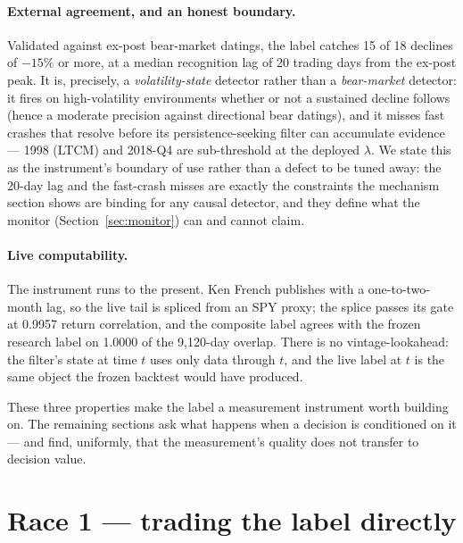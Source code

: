 \documentclass[11pt]{article}
\newcommand{\aidraft}[1]{{\color{aidraftcolor}#1}} %
\newcommand{\aidraft}[1]{#1}
\newcommand{\bearsCaught}{15 of 18}
\newcommand{\detLag}{20}              %
\newcommand{\spliceCorr}{0.9957}
\newcommand{\overlapAgree}{1.0000}
\newcommand{\overlapDays}{9{,}120}
\begin{document}
\paragraph{External agreement, and an honest boundary.}
\aidraft{%
Validated against ex-post bear-market datings, the label catches \bearsCaught{} declines of
$-15\%$ or more, at a median recognition lag of \detLag{} trading days from the ex-post peak.
It is, precisely, a \emph{volatility-state} detector rather than a \emph{bear-market} detector: it
fires on high-volatility environments whether or not a sustained decline follows (hence a moderate
precision against directional bear datings), and it misses fast crashes that resolve before its
persistence-seeking filter can accumulate evidence --- 1998 (LTCM) and 2018-Q4 are sub-threshold at
the deployed $\lambda$.
We state this as the instrument's boundary of use rather than a defect to be tuned away: the
\detLag{}-day lag and the fast-crash misses are exactly the constraints the mechanism section shows
are binding for any causal detector, and they define what the monitor (Section~\ref{sec:monitor})
can and cannot claim.%
}

\paragraph{Live computability.}
\aidraft{%
The instrument runs to the present.
Ken French publishes with a one-to-two-month lag, so the live tail is spliced from an SPY proxy;
the splice passes its gate at \spliceCorr{} return correlation, and the composite label agrees with
the frozen research label on \overlapAgree{} of the \overlapDays{}-day overlap.
There is no vintage-lookahead: the filter's state at time $t$ uses only data through $t$, and the
live label at $t$ is the same object the frozen backtest would have produced.%
}

\aidraft{%
These three properties make the label a measurement instrument worth building on.
The remaining sections ask what happens when a decision is conditioned on it --- and find,
uniformly, that the measurement's quality does not transfer to decision value.%
}


\section{Race 1 --- trading the label directly}
\label{sec:race1}
\end{document}
